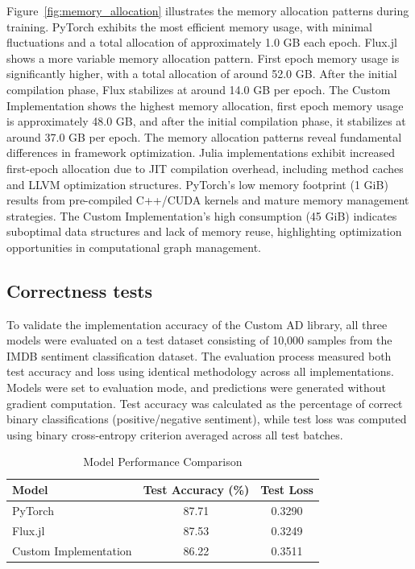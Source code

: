 \documentclass[conference]{IEEEtran}
\begin{document}
Figure~\ref{fig:memory_allocation} illustrates the memory allocation patterns during 
training. PyTorch exhibits the most efficient memory usage,
with minimal fluctuations and a total allocation of approximately 1.0 GB each epoch.
Flux.jl shows a more variable memory allocation pattern. First epoch memory usage is 
significantly higher, with a total allocation of around 52.0 GB. 
After the initial compilation phase, Flux stabilizes at around 14.0 GB per epoch.
The Custom Implementation shows the highest memory allocation, first epoch memory usage is
approximately 48.0 GB, and after the initial compilation phase, it stabilizes at around 37.0 GB per epoch.
The memory allocation patterns reveal fundamental differences in framework optimization. 
Julia implementations exhibit increased first-epoch allocation due to JIT compilation overhead, 
including method caches and LLVM optimization structures. PyTorch's low memory footprint 
(1 GiB) results from pre-compiled C++/CUDA kernels and mature memory management strategies. 
The Custom Implementation's high consumption (45 GiB) indicates suboptimal data structures 
and lack of memory reuse, highlighting optimization opportunities in computational graph management.


\subsection{Correctness tests}

To validate the implementation accuracy of the Custom AD library, all three models were evaluated 
on a test dataset consisting of 10,000 samples from the IMDB sentiment classification dataset. 
The evaluation process measured both test accuracy and loss using identical methodology across 
all implementations. Models were set to evaluation mode, and predictions were generated without 
gradient computation. Test accuracy was calculated as the percentage of correct binary 
classifications (positive/negative sentiment), while test loss was computed using binary 
cross-entropy criterion averaged across all test batches.

\begin{table}[h]
\centering
\caption{Model Performance Comparison}
\begin{tabular}{|l|c|c|}
\hline
\textbf{Model} & \textbf{Test Accuracy (\%)} & \textbf{Test Loss} \\
\hline
PyTorch & 87.71 & 0.3290 \\
\hline
Flux.jl & 87.53 & 0.3249 \\
\hline
Custom Implementation & 86.22 & 0.3511 \\
\hline
\end{tabular}
\label{tab:model_comparison}
\end{table}
\end{document}
